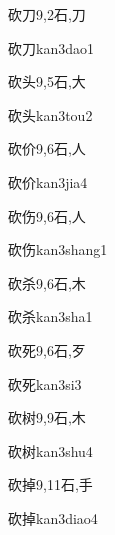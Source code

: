 \begin{Entry}{砍刀}{9,2}{⽯,⼑}
  \begin{Phonetics}{砍刀}{kan3dao1}
  \end{Phonetics}
\end{Entry}

\begin{Entry}{砍头}{9,5}{⽯,⼤}
  \begin{Phonetics}{砍头}{kan3tou2}
  \end{Phonetics}
\end{Entry}

\begin{Entry}{砍价}{9,6}{⽯,⼈}
  \begin{Phonetics}{砍价}{kan3jia4}
  \end{Phonetics}
\end{Entry}

\begin{Entry}{砍伤}{9,6}{⽯,⼈}
  \begin{Phonetics}{砍伤}{kan3shang1}
  \end{Phonetics}
\end{Entry}

\begin{Entry}{砍杀}{9,6}{⽯,⽊}
  \begin{Phonetics}{砍杀}{kan3sha1}
  \end{Phonetics}
\end{Entry}

\begin{Entry}{砍死}{9,6}{⽯,⽍}
  \begin{Phonetics}{砍死}{kan3si3}
  \end{Phonetics}
\end{Entry}

\begin{Entry}{砍树}{9,9}{⽯,⽊}
  \begin{Phonetics}{砍树}{kan3shu4}
  \end{Phonetics}
\end{Entry}

\begin{Entry}{砍掉}{9,11}{⽯,⼿}
  \begin{Phonetics}{砍掉}{kan3diao4}
  \end{Phonetics}
\end{Entry}

